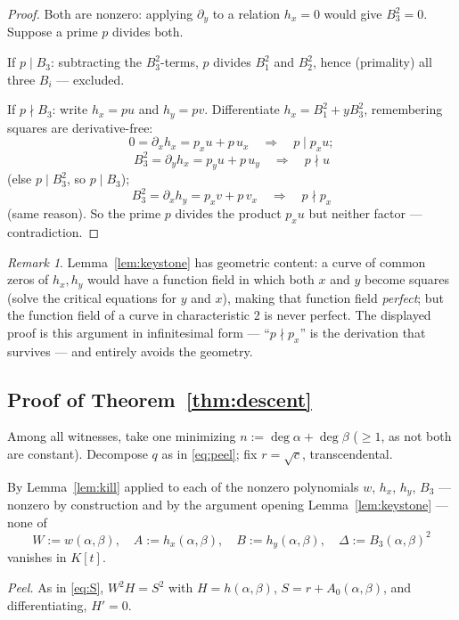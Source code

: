 \documentclass[11pt]{article}
\theoremstyle{definition}
\theoremstyle{remark}
\newtheorem{remark}[theorem]{Remark}
\begin{document}
\begin{proof}
Both are nonzero: applying $\partial_y$ to a relation $h_x = 0$ would
give $B_3^2 = 0$.  Suppose a prime $p$ divides both.

If $p \mid B_3$: subtracting the $B_3^2$-terms, $p$ divides $B_1^2$
and $B_2^2$, hence (primality) all three $B_i$ --- excluded.

If $p \nmid B_3$: write $h_x = p u$ and $h_y = p v$.  Differentiate
$h_x = B_1^2 + y B_3^2$, remembering squares are derivative-free:
\[
  0 = \partial_x h_x = p_x u + p\, u_x
  \quad\Longrightarrow\quad p \mid p_x u ;
\]
\[
  B_3^2 = \partial_y h_x = p_y u + p\, u_y
  \quad\Longrightarrow\quad p \nmid u
\]
(else $p \mid B_3^2$, so $p \mid B_3$);
\[
  B_3^2 = \partial_x h_y = p_x v + p\, v_x
  \quad\Longrightarrow\quad p \nmid p_x
\]
(same reason).  So the prime $p$ divides the product $p_x u$ but
neither factor --- contradiction.
\end{proof}

\begin{remark}
Lemma~\ref{lem:keystone} has geometric content: a curve of common
zeros of $h_x, h_y$ would have a function field in which both $x$ and
$y$ become squares (solve the critical equations for $y$ and $x$),
making that function field \emph{perfect}; but the function field of a
curve in characteristic $2$ is never perfect.  The displayed proof is
this argument in infinitesimal form --- ``$p \nmid p_x$'' is the
derivation that survives --- and entirely avoids the geometry.
\end{remark}

\subsection{Proof of Theorem~\ref{thm:descent}}

Among all witnesses, take one minimizing
$n := \deg\alpha + \deg\beta$ ($\geq 1$, as not both are constant).
Decompose $q$ as in \eqref{eq:peel}; fix $r = \sqrt{c}$,
transcendental.

By Lemma~\ref{lem:kill} applied to each of the
nonzero polynomials $w$, $h_x$, $h_y$, $B_3$ --- nonzero by
construction and by the argument opening Lemma~\ref{lem:keystone} ---
none of
\[
  W := w(\alpha,\beta), \quad
  A := h_x(\alpha,\beta), \quad
  B := h_y(\alpha,\beta), \quad
  \Delta := B_3(\alpha,\beta)^2
\]
vanishes in $K[t]$.

\emph{Peel.}  As in \eqref{eq:S}, $W^2 H = S^2$ with
$H = h(\alpha,\beta)$, $S = r + A_0(\alpha,\beta)$, and
differentiating, $H' = 0$.
\end{document}
